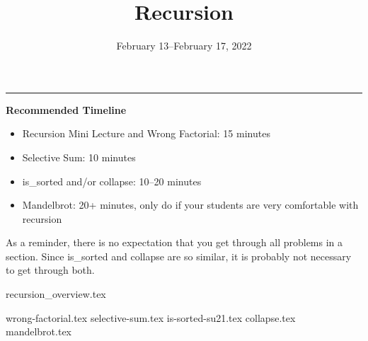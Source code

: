 \documentclass{exam}
\title{Recursion}
\date{February 13--February 17, 2022}
\begin{document}
\maketitle
\rule{\textwidth}{0.15em}
\fontsize{12}{15}\selectfont

\begin{meta}
\textbf{Recommended Timeline}
\begin{itemize}
    \item Recursion Mini Lecture and Wrong Factorial: 15 minutes
    \item Selective Sum: 10 minutes
    \item is\_sorted and/or collapse: 10--20 minutes
    \item Mandelbrot: 20+ minutes, only do if your students are very comfortable with recursion
\end{itemize}
As a reminder, there is no expectation that you get through all problems in a section. Since is\_sorted and collapse are so similar, it is probably not necessary to get through both. 
\end{meta}

{recursion_overview.tex}
\begin{questions}
    {wrong-factorial.tex}
    {selective-sum.tex}
    {is-sorted-su21.tex}
    {collapse.tex}
    {mandelbrot.tex}
\end{questions}
\end{document}
